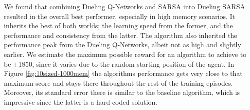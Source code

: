 We found that combining Dueling Q-Networks and SARSA into Dueling SARSA resulted in the overall best performer, especially in high memory scenarios. It inherits the best of both worlds; the learning speed from the former, and the performance and consistency from the latter. The algorithm also inherited the performance peak from the Dueling Q-Networks, albeit not as high and slightly earlier. We estimate the maximum possible reward for an algorithm to achieve to be $\pm$1850, since it varies due to the random starting position of the agent. In Figure \ref{fig:10sized-1000mem} the algorithms performance gets very close to that maximum score and stays there throughout the rest of the training episodes. Moreover, its standard error there is similar to the baseline algorithm, which is impressive since the latter is a hard-coded solution.




